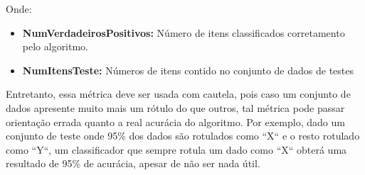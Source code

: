 Onde:

\begin{itemize}
    \item \textbf{NumVerdadeirosPositivos:} Número de itens classificados
        corretamento pelo algoritmo.
    \item \textbf{NumItensTeste:} Números de itens contido no conjunto de dados de testes
\end{itemize}

Entretanto, essa métrica deve ser usada com cautela, pois caso um conjunto de
dados apresente muito mais um rótulo do que outros, tal métrica pode passar
orientação errada quanto a real acurácia do algoritmo. Por exemplo, dado um
conjunto de teste onde 95\% dos dados são rotulados como ``X`` e o resto rotulado
como ``Y``, um classificador que sempre rotula um dado como ``X`` obterá uma
resultado de 95\% de acurácia, apesar de não ser nada útil.

